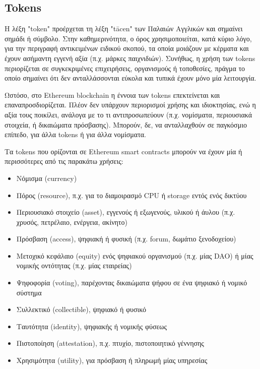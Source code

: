 \subsection{Tokens}

Η λέξη "token" προέρχεται τη λέξη "tācen" των Παλαιών Αγγλικών και σημαίνει σημάδι ή
σύμβολο. Στην καθημερινότητα, ο όρος χρησιμοποιείται, κατά κύριο λόγο, για την περιγραφή αντικειμένων ειδικού σκοπού, τα οποία μοιάζουν με κέρματα και έχουν ασήμαντη εγγενή αξία (π.χ. μάρκες παιχνιδιών). Συνήθως, η χρήση των tokens περιορίζεται σε συγκεκριμένες επιχειρήσεις, οργανισμούς ή τοποθεσίες, πράγμα το οποίο σημαίνει ότι δεν ανταλλάσσονται εύκολα και τυπικά έχουν μόνο μία λειτουργία.\cite{2.6-ethereum-mastering}

Ωστόσο, στο Ethereum blockchain η έννοια των tokens επεκτείνεται και επαναπροσδιορίζεται. Πλέον δεν υπάρχουν περιορισμοί χρήσης και ιδιοκτησίας, ενώ η αξία τους ποικίλει, ανάλογα με το τι αντιπροσωπεύουν (π.χ. νομίσματα, περιουσιακά στοιχεία, ή δικαιώματα πρόσβασης). Μπορούν, δε, να ανταλλαχθούν σε παγκόσμιο επίπεδο, για άλλα tokens ή για άλλα νομίσματα.

Τα tokens που ορίζονται σε Ethereum smart contracts μπορούν να έχουν μία ή περισσότερες από τις παρακάτω χρήσεις:

\begin{itemize}
	\item Νόμισμα (currency)
	\item Πόρος (resource), π.χ. για το διαμοιρασμό CPU ή storage εντός ενός δικτύου
	\item Περιουσιακό στοιχείο (asset), εγγενούς ή εξωγενούς, υλικού
ή άυλου (π.χ. χρυσός, πετρέλαιο, ενέργεια, ακίνητο)
	\item Πρόσβαση (access), ψηφιακή ή
φυσική (π.χ. forum, δωμάτιο ξενοδοχείου)
	\item Μετοχικό κεφάλαιο (equity) ενός ψηφιακού οργανισμού (π.χ. μίας DAO) ή μίας νομικής οντότητας (π.χ. μίας εταιρείας)
	\item Ψηφοφορία (voting), παρέχοντας δικαιώματα ψήφου σε ένα ψηφιακό ή νομικό σύστημα
	\item Συλλεκτικό (collectible), ψηφιακό ή φυσικό
	\item Ταυτότητα (identity), ψηφιακής ή νομικής φύσεως
	\item Πιστοποίηση (attestation), π.χ. πτυχίο, πιστοποιητικό γέννησης
	\item Χρησιμότητα (utility), για πρόσβαση ή πληρωμή μίας υπηρεσίας
\end{itemize}

